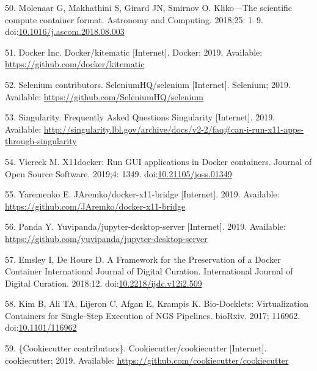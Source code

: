 \documentclass[10pt,letterpaper]{article}
\begin{document}
\leavevmode\hypertarget{ref-molenaar_klikoscientific_2018}{}%
50. Molenaar G, Makhathini S, Girard JN, Smirnov O. Kliko---The
scientific compute container format. Astronomy and Computing. 2018;25:
1--9.
doi:\href{https://doi.org/10.1016/j.ascom.2018.08.003}{10.1016/j.ascom.2018.08.003}

\leavevmode\hypertarget{ref-docker_kitematic_2019}{}%
51. Docker Inc. Docker/kitematic {[}Internet{]}. Docker; 2019.
Available: \url{https://github.com/docker/kitematic}

\leavevmode\hypertarget{ref-selenium_2019}{}%
52. Selenium contributors. SeleniumHQ/selenium {[}Internet{]}. Selenium;
2019. Available: \url{https://github.com/SeleniumHQ/selenium}

\leavevmode\hypertarget{ref-singularity_frequently_2019}{}%
53. Singularity. Frequently Asked Questions Singularity {[}Internet{]}.
2019. Available:
\url{http://singularity.lbl.gov/archive/docs/v2-2/faq\#can-i-run-x11-apps-through-singularity}

\leavevmode\hypertarget{ref-viereck_x11docker_2019}{}%
54. Viereck M. X11docker: Run GUI applications in Docker containers.
Journal of Open Source Software. 2019;4: 1349.
doi:\href{https://doi.org/10.21105/joss.01349}{10.21105/joss.01349}

\leavevmode\hypertarget{ref-yaremenko_docker-x11-bridge_2019}{}%
55. Yaremenko E. JAremko/docker-x11-bridge {[}Internet{]}. 2019.
Available: \url{https://github.com/JAremko/docker-x11-bridge}

\leavevmode\hypertarget{ref-yuvipanda_jupyter-desktop-server_2019}{}%
56. Panda Y. Yuvipanda/jupyter-desktop-server {[}Internet{]}. 2019.
Available: \url{https://github.com/yuvipanda/jupyter-desktop-server}

\leavevmode\hypertarget{ref-emsley_framework_2018}{}%
57. Emsley I, De Roure D. A Framework for the Preservation of a Docker
Container International Journal of Digital Curation. International
Journal of Digital Curation. 2018;12.
doi:\href{https://doi.org/10.2218/ijdc.v12i2.509}{10.2218/ijdc.v12i2.509}

\leavevmode\hypertarget{ref-kim_bio-docklets_2017}{}%
58. Kim B, Ali TA, Lijeron C, Afgan E, Krampis K. Bio-Docklets:
Virtualization Containers for Single-Step Execution of NGS Pipelines.
bioRxiv. 2017; 116962.
doi:\href{https://doi.org/10.1101/116962}{10.1101/116962}

\leavevmode\hypertarget{ref-cookiecutter_contributors_cookiecutter_2019}{}%
59. \{Cookiecutter contributors\}. Cookiecutter/cookiecutter
{[}Internet{]}. cookiecutter; 2019. Available:
\url{https://github.com/cookiecutter/cookiecutter}
\end{document}
